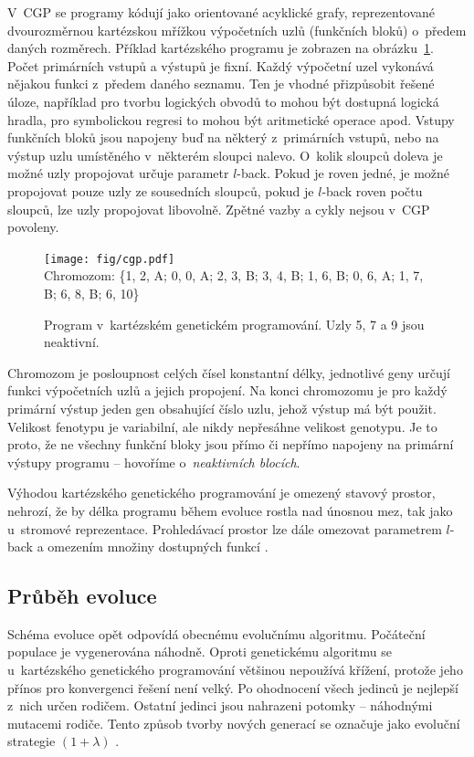 V~CGP se programy kódují jako orientované acyklické grafy, reprezentované dvourozměrnou kartézskou mřížkou výpočetních uzlů (funkčních bloků) o~předem daných rozměrech. Příklad kartézského programu je zobrazen na obrázku~\ref{obrCGP}. Počet primárních vstupů a výstupů je fixní. Každý výpočetní uzel vykonává nějakou funkci z~předem daného seznamu. Ten je vhodné přizpůsobit řešené úloze, například pro tvorbu logických obvodů to mohou být dostupná logická hradla, pro symbolickou regresi to mohou být aritmetické operace apod. Vstupy funkčních bloků jsou napojeny buď na některý z~primárních vstupů, nebo na výstup uzlu umístěného v~některém sloupci nalevo. O~kolik sloupců doleva je možné uzly propojovat určuje parametr $l$-back. Pokud je roven jedné, je možné propojovat pouze uzly ze sousedních sloupců, pokud je $l$-back roven počtu sloupců, lze uzly propojovat libovolně. Zpětné vazby a cykly nejsou v~CGP povoleny.

\begin{figure}[htb]
    \centering\texttt{[image: fig/cgp.pdf]} \\
    {\scriptsize{}Chromozom: \{1, 2, A; 0, 0, A; 2, 3, B; 3, 4, B; 1, 6, B; 0, 6, A; 1, 7, B; 6, 8, B; 6, 10\}}
    \caption{Program v~kartézském genetickém programování. Uzly 5, 7 a 9 jsou neaktivní.}
    \label{obrCGP}
\end{figure}

Chromozom je posloupnost celých čísel konstantní délky, jednotlivé geny určují funkci výpočetních uzlů a jejich propojení. Na konci chromozomu je pro každý primární výstup jeden gen obsahující číslo uzlu, jehož výstup má být použit. Velikost fenotypu je variabilní, ale nikdy nepřesáhne velikost genotypu. Je to proto, že ne všechny funkční bloky jsou přímo či nepřímo napojeny na primární výstupy programu -- hovoříme o~\emph{neaktivních blocích}.

Výhodou kartézského genetického programování je omezený stavový prostor, nehrozí, že by délka programu během evoluce rostla nad únosnou mez, tak jako u~stromové reprezentace. Prohledávací prostor lze dále omezovat parametrem $l$-back a omezením množiny dostupných funkcí \cite{ZelenaCGP, Modra, HandbookGP}.

\subsection{Průběh evoluce}
\label{secCGPEvo}

Schéma evoluce opět odpovídá obecnému evolučnímu algoritmu. Počáteční populace je vygenerována náhodně. Oproti genetickému algoritmu se u~kartézského genetického programování většinou nepoužívá křížení, protože jeho přínos pro konvergenci řešení není velký. Po ohodnocení všech jedinců je nejlepší z~nich určen rodičem. Ostatní jedinci jsou nahrazeni potomky -- náhodnými mutacemi rodiče. Tento způsob tvorby nových generací se označuje jako evoluční strategie $(1 + \lambda)$ \cite{Modra}.

